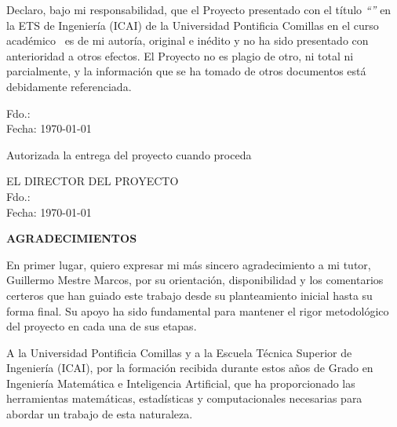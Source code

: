 \vspace{1cm}

\noindent
Declaro, bajo mi responsabilidad, que el Proyecto presentado con el título
\emph{``\tfgtitle''} en la ETS de Ingeniería (ICAI) de la Universidad
Pontificia Comillas en el curso académico \tfgyear\ es de mi autoría,
original e inédito y no ha sido presentado con anterioridad a otros
efectos. El Proyecto no es plagio de otro, ni total ni parcialmente, y la
información que se ha tomado de otros documentos está debidamente
referenciada.

\vspace{3cm}

\begin{flushright}
\begin{minipage}{0.55\textwidth}
\raggedleft
Fdo.: \tfgauthor \\
Fecha: \today

\vspace{2cm}

Autorizada la entrega del proyecto cuando proceda \\

\vspace{1cm}

EL DIRECTOR DEL PROYECTO \\[1.5cm]
Fdo.: \tfgtutor \\
Fecha: \today
\end{minipage}
\end{flushright}

\clearpage

\thispagestyle{plain}
\begin{center}
{\bfseries\large AGRADECIMIENTOS}
\end{center}

\vspace{1cm}

\noindent
En primer lugar, quiero expresar mi más sincero agradecimiento a mi tutor,
Guillermo Mestre Marcos, por su orientación, disponibilidad y los
comentarios certeros que han guiado este trabajo desde su planteamiento
inicial hasta su forma final. Su apoyo ha sido fundamental para mantener el
rigor metodológico del proyecto en cada una de sus etapas.

\vspace{0.5cm}

\noindent
A la Universidad Pontificia Comillas y a la Escuela Técnica Superior de
Ingeniería (ICAI), por la formación recibida durante estos años de Grado en
Ingeniería Matemática e Inteligencia Artificial, que ha proporcionado las
herramientas matemáticas, estadísticas y computacionales necesarias para
abordar un trabajo de esta naturaleza.

